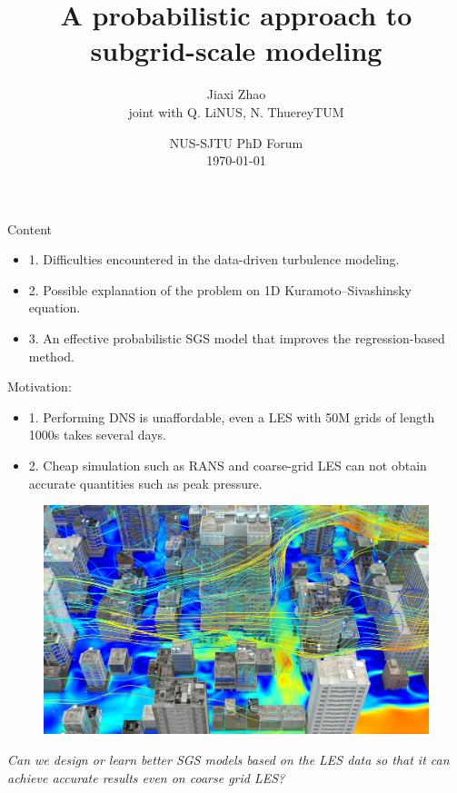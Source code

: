\documentclass[paper slide]{beamer}
\title[Probabilistic SGS modeling]{A probabilistic approach to 
		subgrid-scale modeling}
\author[J. Zhao]{Jiaxi Zhao \\ \small joint with Q. Li\@ NUS, N. Thuerey\@ TUM}
\date[\today]{NUS-SJTU PhD Forum \\ \today}
\begin{document}
\par \setlength{\parindent}{2em}

\begin{frame}
\titlepage
\end{frame}


\begin{frame}{Content}
	\begin{itemize}
		\item 1. Difficulties encountered in the data-driven turbulence modeling.
		\item 2. Possible explanation of the problem on 1D Kuramoto–Sivashinsky
		equation.
		\item 3. An effective probabilistic SGS model that improves the
		regression-based method.
	\end{itemize}
\end{frame}


\begin{frame}{Motivation:}
	\begin{itemize}
		\item 1. Performing DNS is unaffordable, even a LES with 50M grids of length 1000s takes several days.
		\item 2. Cheap simulation such as RANS and coarse-grid LES can not obtain accurate quantities such as peak pressure.
	\end{itemize}
	\begin{figure}[ht]
		\centering
		\includegraphics[width=.6\linewidth]{fig/urban_environment.jpeg}
	\end{figure}
	\textit{Can we {\color{red}design or learn better SGS models} based on the LES data so that it can achieve accurate
	results even {\color{red}on coarse grid LES?}}
\end{frame}
\end{document}
